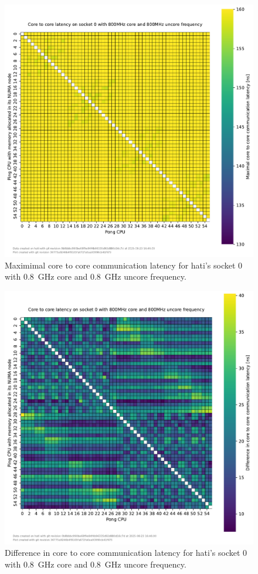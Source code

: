 \begin{figure}[]
    \centering
    \includegraphics[width=\columnwidth]{fig/core-to-core-latency/core-to-core-heatmap-max-800-800.pdf}
    \caption{Maximimal core to core communication latency for hati's socket 0 with \SI{0.8}{\GHz} core and \SI{0.8}{\GHz} uncore frequency.}
\end{figure}
\begin{figure}[]
    \centering
    \includegraphics[width=\columnwidth]{fig/core-to-core-latency/core-to-core-heatmap-diff-800-800.pdf}
    \caption{Difference in core to core communication latency for hati's socket 0 with \SI{0.8}{\GHz} core and \SI{0.8}{\GHz} uncore frequency.}
\end{figure}

